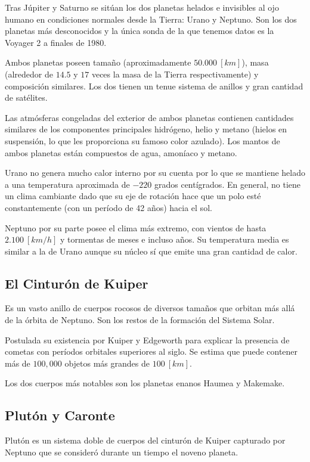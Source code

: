 \documentclass{tufte-handout}
\begin{document}
Tras Júpiter y Saturno se sitúan los dos planetas helados e invisibles al ojo humano en condiciones normales desde la Tierra: Urano y Neptuno. Son los dos planetas más desconocidos y la única sonda de la que tenemos datos es la Voyager 2 a finales de 1980.

Ambos planetas poseen tamaño (aproximadamente $50.000~[km]$), masa (alrededor de $14.5$ y $17$ veces la masa de la Tierra respectivamente) y composición similares. Los dos tienen un tenue sistema de anillos y gran cantidad de satélites.

Las atmósferas congeladas del exterior de ambos planetas contienen cantidades similares de los componentes principales hidrógeno, helio y metano (hielos en suspensión, lo que les proporciona su famoso color azulado). Los mantos de ambos planetas están compuestos de agua, amoníaco y metano.

Urano no genera mucho calor interno por su cuenta por lo que se mantiene helado a una temperatura aproximada de $-220$ grados centígrados. En general, no tiene un clima cambiante dado que su eje de rotación hace que un polo esté constantemente (con un período de 42 años) hacia el sol.

Neptuno por su parte posee el clima más extremo, con vientos de hasta $2.100~[km/h]$ y tormentas de meses e incluso años. Su temperatura media es similar a la de Urano aunque su núcleo sí que emite una gran cantidad de calor.

\subsection{El Cinturón de Kuiper}

Es un vasto anillo de cuerpos rocosos de diversos tamaños que orbitan más allá de la órbita de Neptuno. Son los restos de la formación del Sistema Solar.

Postulada su existencia por Kuiper y Edgeworth para explicar la presencia de cometas con períodos orbitales superiores al siglo. Se estima que puede contener más de $100,000$ objetos más grandes de $100~[km]$.

Los dos cuerpos más notables son los planetas enanos Haumea y Makemake.

\subsection{Plutón y Caronte}

Plutón es un sistema doble de cuerpos del cinturón de Kuiper capturado por Neptuno que se consideró durante un tiempo el noveno planeta.
\end{document}
